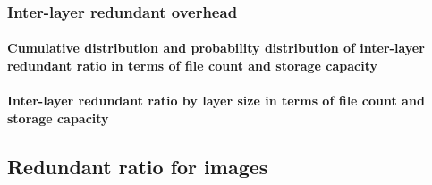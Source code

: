 \subsubsection{Inter-layer redundant overhead}

\paragraph{Cumulative distribution and probability distribution of inter-layer redundant ratio in terms of file count and storage capacity}


\paragraph{Inter-layer redundant ratio by layer size in terms of file count and storage capacity}

\subsection{Redundant ratio for images}

